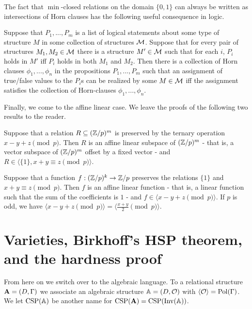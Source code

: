 \documentclass[letterpaper,11pt]{article}
\DeclareMathOperator{\Pol}{Pol}
\DeclareMathOperator{\Inv}{Inv}
\DeclareMathOperator{\CSP}{CSP}
\begin{document}
\begin{rem} The fact that $\min$-closed relations on the domain $\{0,1\}$ can always be written as intersections of Horn clauses has the following useful consequence in logic.

Suppose that $P_1, ..., P_m$ is a list of logical statements about some type of structure $M$ in some collection of structures $\mathcal{M}$. Suppose that for every pair of structures $M_1, M_2 \in \mathcal{M}$ there is a structure $M' \in \mathcal{M}$ such that for each $i$, $P_i$ holds in $M'$ iff $P_i$ holds in both $M_1$ and $M_2$. Then there is a collection of Horn clauses $\phi_1, ..., \phi_n$ in the propositions $P_1, ..., P_m$ such that an assignment of true/false values to the $P_i$s can be realized by some $M \in \mathcal{M}$ iff the assignment satisfies the collection of Horn-clauses $\phi_1, ..., \phi_n$.
\end{rem}

Finally, we come to the affine linear case. We leave the proofs of the following two results to the reader.

\begin{thm} Suppose that a relation $R \subseteq (\mathbb{Z}/p)^m$ is preserved by the ternary operation $x - y + z \pmod{p}$. Then $R$ is an affine linear subspace of $(\mathbb{Z}/p)^m$ - that is, a vector subspace of $(\mathbb{Z}/p)^m$ offset by a fixed vector - and $R \in \langle \{1\}, x+y\equiv z\pmod{p}\rangle$.
\end{thm}

\begin{thm} Suppose that a function $f : (\mathbb{Z}/p)^k \rightarrow \mathbb{Z}/p$ preserves the relations $\{1\}$ and $x+y \equiv z \pmod{p}$. Then $f$ is an affine linear function - that is, a linear function such that the sum of the coefficients is $1$ - and $f \in \langle x-y+z \pmod{p} \rangle$. If $p$ is odd, we have $\langle x-y+z \pmod{p} \rangle = \langle \frac{x+y}{2} \pmod{p} \rangle$.
\end{thm}


\section{Varieties, Birkhoff's HSP theorem, and the hardness proof}

From here on we switch over to the algebraic language. To a relational structure $\mathbf{A} = (D, \Gamma)$ we associate an algebraic structure $\mathbb{A} = (D, \mathcal{O})$ with $\langle \cO \rangle = \Pol(\Gamma)$. We let $\CSP(\bA)$ be another name for $\CSP(\fA) = \CSP(\Inv(\bA))$.
\end{document}
